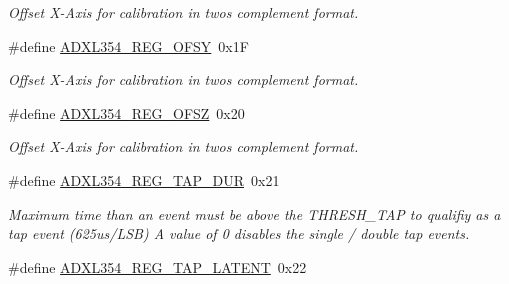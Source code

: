 \begin{DoxyCompactItemize}
\begin{DoxyCompactList}\small\item\em \-Offset \-X-\/\-Axis for calibration in twos complement format. \end{DoxyCompactList}\item 
\hypertarget{group___a_d_x_l354___r_e_g_i_s_t_e_r_s_gac3c9587801aba98589bb0987d6fcecb2}{\#define \hyperlink{group___a_d_x_l354___r_e_g_i_s_t_e_r_s_gac3c9587801aba98589bb0987d6fcecb2}{\-A\-D\-X\-L354\-\_\-\-R\-E\-G\-\_\-\-O\-F\-S\-Y}~0x1\-F}\label{group___a_d_x_l354___r_e_g_i_s_t_e_r_s_gac3c9587801aba98589bb0987d6fcecb2}

\begin{DoxyCompactList}\small\item\em \-Offset \-X-\/\-Axis for calibration in twos complement format. \end{DoxyCompactList}\item 
\hypertarget{group___a_d_x_l354___r_e_g_i_s_t_e_r_s_ga8e325fadf8f2e84762c76383458aaca6}{\#define \hyperlink{group___a_d_x_l354___r_e_g_i_s_t_e_r_s_ga8e325fadf8f2e84762c76383458aaca6}{\-A\-D\-X\-L354\-\_\-\-R\-E\-G\-\_\-\-O\-F\-S\-Z}~0x20}\label{group___a_d_x_l354___r_e_g_i_s_t_e_r_s_ga8e325fadf8f2e84762c76383458aaca6}

\begin{DoxyCompactList}\small\item\em \-Offset \-X-\/\-Axis for calibration in twos complement format. \end{DoxyCompactList}\item 
\hypertarget{group___a_d_x_l354___r_e_g_i_s_t_e_r_s_gab2b3f895d20a431886d12a66ff748f37}{\#define \hyperlink{group___a_d_x_l354___r_e_g_i_s_t_e_r_s_gab2b3f895d20a431886d12a66ff748f37}{\-A\-D\-X\-L354\-\_\-\-R\-E\-G\-\_\-\-T\-A\-P\-\_\-\-D\-U\-R}~0x21}\label{group___a_d_x_l354___r_e_g_i_s_t_e_r_s_gab2b3f895d20a431886d12a66ff748f37}

\begin{DoxyCompactList}\small\item\em \-Maximum time than an event must be above the \-T\-H\-R\-E\-S\-H\-\_\-\-T\-A\-P to qualifiy as a tap event (625us/\-L\-S\-B) \-A value of 0 disables the single / double tap events. \end{DoxyCompactList}\item 
\hypertarget{group___a_d_x_l354___r_e_g_i_s_t_e_r_s_ga6dd85cda6dbd783a3f349754b94f21c1}{\#define \hyperlink{group___a_d_x_l354___r_e_g_i_s_t_e_r_s_ga6dd85cda6dbd783a3f349754b94f21c1}{\-A\-D\-X\-L354\-\_\-\-R\-E\-G\-\_\-\-T\-A\-P\-\_\-\-L\-A\-T\-E\-N\-T}~0x22}\label{group___a_d_x_l354___r_e_g_i_s_t_e_r_s_ga6dd85cda6dbd783a3f349754b94f21c1}


\end{DoxyCompactItemize}
